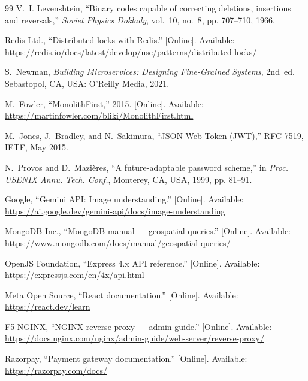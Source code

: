 \documentclass[journal,onecolumn,11pt]{IEEEtran}
\begin{document}
\begin{thebibliography}{99}
V.~I. Levenshtein, ``Binary codes capable of correcting deletions, insertions
and reversals,'' \emph{Soviet Physics Doklady}, vol.~10, no.~8, pp. 707--710,
1966.

Redis Ltd., ``Distributed locks with Redis.'' [Online]. Available:
\url{https://redis.io/docs/latest/develop/use/patterns/distributed-locks/}

S.~Newman, \emph{Building Microservices: Designing Fine-Grained Systems},
2nd~ed. Sebastopol, CA, USA: O'Reilly Media, 2021.

M.~Fowler, ``MonolithFirst,'' 2015. [Online]. Available:
\url{https://martinfowler.com/bliki/MonolithFirst.html}

M.~Jones, J.~Bradley, and N.~Sakimura, ``JSON Web Token (JWT),'' RFC 7519,
IETF, May 2015.

N.~Provos and D.~Mazi\`{e}res, ``A future-adaptable password scheme,'' in
\emph{Proc. USENIX Annu. Tech. Conf.}, Monterey, CA, USA, 1999, pp. 81--91.

Google, ``Gemini API: Image understanding.'' [Online]. Available:
\url{https://ai.google.dev/gemini-api/docs/image-understanding}

MongoDB Inc., ``MongoDB manual --- geospatial queries.'' [Online]. Available:
\url{https://www.mongodb.com/docs/manual/geospatial-queries/}

OpenJS Foundation, ``Express 4.x API reference.'' [Online]. Available:
\url{https://expressjs.com/en/4x/api.html}

Meta Open Source, ``React documentation.'' [Online]. Available:
\url{https://react.dev/learn}

F5 NGINX, ``NGINX reverse proxy --- admin guide.'' [Online]. Available:
\url{https://docs.nginx.com/nginx/admin-guide/web-server/reverse-proxy/}

Razorpay, ``Payment gateway documentation.'' [Online]. Available:
\url{https://razorpay.com/docs/}

\end{thebibliography}
\end{document}
